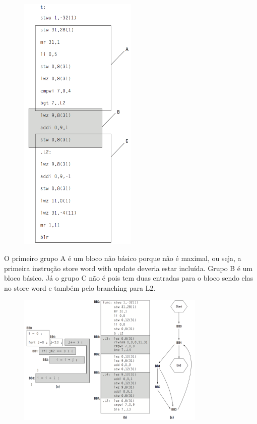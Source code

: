 \begin{figure}[h] \centering
	\includegraphics[width=0.5\textwidth]{img/f3-5.png}
	\caption{}
	\label{fig:f3-5}
\end{figure}

O primeiro grupo A é um bloco não básico porque não é maximal, ou seja, a primeira instrução store word with update deveria estar incluída. Grupo B é um bloco básico. Já o grupo C não é pois tem duas entradas para o bloco sendo elas no store word e também pelo branching para L2.

\begin{figure}[h] \centering
	\includegraphics[width=0.8\textwidth]{img/f3-6.png}
	\caption{}
	\label{fig:f3-6}
\end{figure}

